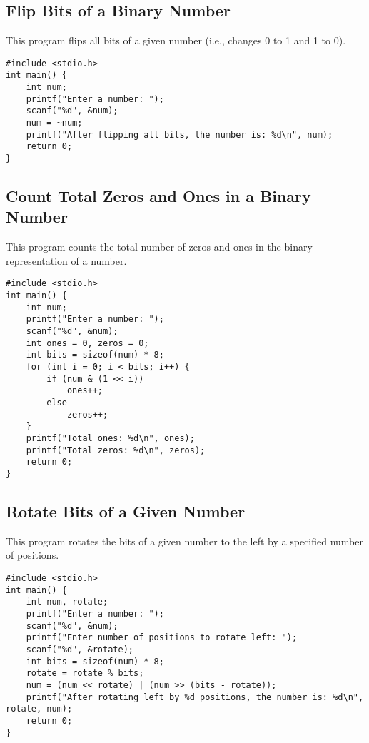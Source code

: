 \documentclass[a4paper,12pt]{article}
\begin{document}
\newpage

\subsection{Flip Bits of a Binary Number}
This program flips all bits of a given number (i.e., changes 0 to 1 and 1 to 0).

\begin{lstlisting}[caption={Flip Bits of a Binary Number}]
#include <stdio.h>
int main() {
    int num;
    printf("Enter a number: ");
    scanf("%d", &num);
    num = ~num;
    printf("After flipping all bits, the number is: %d\n", num);
    return 0;
}
\end{lstlisting}

\newpage

\subsection{Count Total Zeros and Ones in a Binary Number}
This program counts the total number of zeros and ones in the binary representation of a number.

\begin{lstlisting}[caption={Count Total Zeros and Ones in a Binary Number}]
#include <stdio.h>
int main() {
    int num;
    printf("Enter a number: ");
    scanf("%d", &num);
    int ones = 0, zeros = 0;
    int bits = sizeof(num) * 8;
    for (int i = 0; i < bits; i++) {
        if (num & (1 << i))
            ones++;
        else
            zeros++;
    }
    printf("Total ones: %d\n", ones);
    printf("Total zeros: %d\n", zeros);
    return 0;
}
\end{lstlisting}

\newpage

\subsection{Rotate Bits of a Given Number}
This program rotates the bits of a given number to the left by a specified number of positions.

\begin{lstlisting}[caption={Rotate Bits of a Given Number}]
#include <stdio.h>
int main() {
    int num, rotate;
    printf("Enter a number: ");
    scanf("%d", &num);
    printf("Enter number of positions to rotate left: ");
    scanf("%d", &rotate);
    int bits = sizeof(num) * 8;
    rotate = rotate % bits;
    num = (num << rotate) | (num >> (bits - rotate));
    printf("After rotating left by %d positions, the number is: %d\n", rotate, num);
    return 0;
}
\end{lstlisting}
\end{document}
